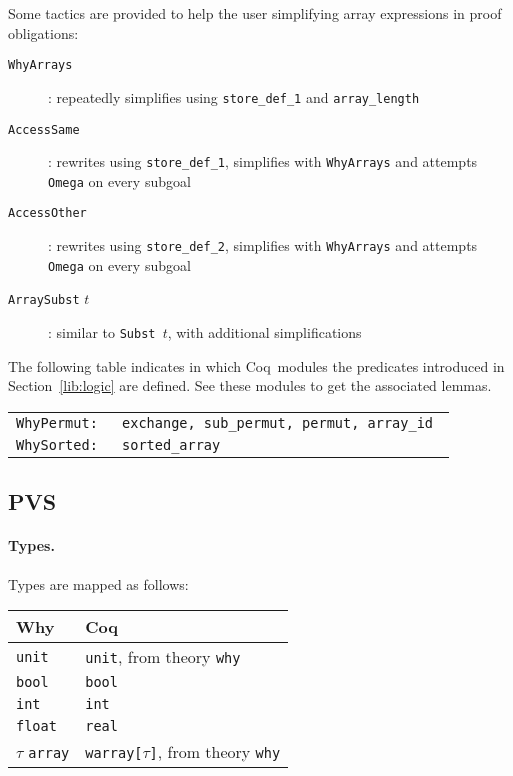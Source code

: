 \documentclass[a4paper,12pt]{report}
\makeatletter
\newcommand{\coq}{\textsf{Coq}\index{Coq@\textsf{Coq}}}
\newcommand{\why}{\textsf{Why}}
\makeatother
\begin{document}
Some tactics are provided to help the user simplifying array expressions
in proof obligations:
\begin{description}
\item[\texttt{WhyArrays}] : repeatedly simplifies using
  \texttt{store\_def\_1} and \texttt{array\_length}
\item[\texttt{AccessSame}] : rewrites using \texttt{store\_def\_1},
  simplifies with \texttt{WhyArrays} and attempts \texttt{Omega} on
  every subgoal
\item[\texttt{AccessOther}] : rewrites using \texttt{store\_def\_2},
  simplifies with \texttt{WhyArrays} and attempts \texttt{Omega} on
  every subgoal
\item[\texttt{ArraySubst} $t$] : similar to \texttt{Subst $t$}, with
  additional simplifications
\end{description}

The following table indicates in which \coq\ modules the predicates
introduced in Section~\ref{lib:logic} are defined. See these modules
to get the associated lemmas.
\begin{center}
  \begin{tabular}{rl}
    \tt WhyPermut: & \tt exchange, sub\_permut, permut, array\_id \\
    \tt WhySorted: & \tt sorted\_array
  \end{tabular}
\end{center}


\subsection{PVS}
\label{lib:pvs}

\paragraph{Types.} 
Types are mapped as follows:
\begin{center}
  \begin{tabular}{|l|l|}
    \hline
    \why & \coq \\
    \hline
    \texttt{unit} & \texttt{unit}, from theory \texttt{why} \\
    \hline
    \texttt{bool} & \texttt{bool} \\
    \hline
    \texttt{int} & \texttt{int} \\
    \hline
    \texttt{float} & \texttt{real} \\
    \hline
    $\tau$ \texttt{array} & \texttt{warray[$\tau$]},
                            from theory \texttt{why} \\
    \hline
  \end{tabular}
\end{center}
\end{document}
